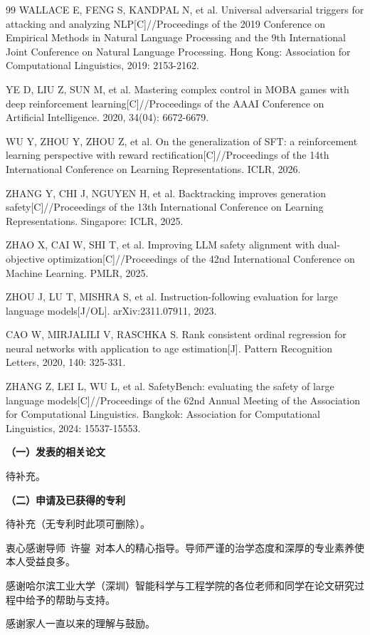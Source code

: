 \documentclass[fontset=fandol,type=master,campus=shenzhen,etitleauto=true]{hithesisbook}
\begin{document}
\begin{thebibliography}{99}
 WALLACE E, FENG S, KANDPAL N, et al. Universal adversarial triggers for attacking and analyzing NLP[C]//Proceedings of the 2019 Conference on Empirical Methods in Natural Language Processing and the 9th International Joint Conference on Natural Language Processing. Hong Kong: Association for Computational Linguistics, 2019: 2153-2162.

 YE D, LIU Z, SUN M, et al. Mastering complex control in MOBA games with deep reinforcement learning[C]//Proceedings of the AAAI Conference on Artificial Intelligence. 2020, 34(04): 6672-6679.

 WU Y, ZHOU Y, ZHOU Z, et al. On the generalization of SFT: a reinforcement learning perspective with reward rectification[C]//Proceedings of the 14th International Conference on Learning Representations. ICLR, 2026.

 ZHANG Y, CHI J, NGUYEN H, et al. Backtracking improves generation safety[C]//Proceedings of the 13th International Conference on Learning Representations. Singapore: ICLR, 2025.

 ZHAO X, CAI W, SHI T, et al. Improving LLM safety alignment with dual-objective optimization[C]//Proceedings of the 42nd International Conference on Machine Learning. PMLR, 2025.

 ZHOU J, LU T, MISHRA S, et al. Instruction-following evaluation for large language models[J/OL]. arXiv:2311.07911, 2023.

 CAO W, MIRJALILI V, RASCHKA S. Rank consistent ordinal regression for neural networks with application to age estimation[J]. Pattern Recognition Letters, 2020, 140: 325-331.

 ZHANG Z, LEI L, WU L, et al. SafetyBench: evaluating the safety of large language models[C]//Proceedings of the 62nd Annual Meeting of the Association for Computational Linguistics. Bangkok: Association for Computational Linguistics, 2024: 15537-15553.

\end{thebibliography}

\begin{publication}
\noindent\textbf{（一）发表的相关论文}
\begin{publist}
\item 待补充。
\end{publist}

\noindent\textbf{（二）申请及已获得的专利}
\begin{publist}
\item 待补充（无专利时此项可删除）。
\end{publist}
\end{publication}

\authorization

\begin{acknowledgements}
衷心感谢导师~许鋆~对本人的精心指导。导师严谨的治学态度和深厚的专业素养使本人受益良多。

感谢哈尔滨工业大学（深圳）智能科学与工程学院的各位老师和同学在论文研究过程中给予的帮助与支持。

感谢家人一直以来的理解与鼓励。
\end{acknowledgements}
\end{document}
